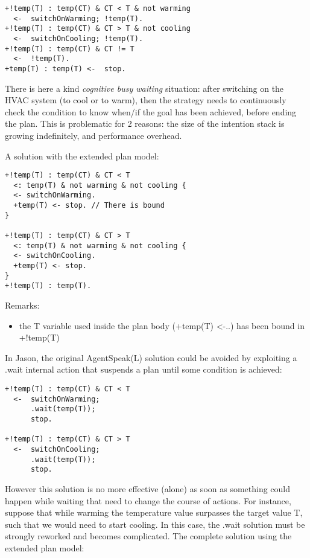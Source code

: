 {\small
\begin{verbatim}
+!temp(T) : temp(CT) & CT < T & not warming
  <-  switchOnWarming; !temp(T).
+!temp(T) : temp(CT) & CT > T & not cooling
  <-  switchOnCooling; !temp(T).
+!temp(T) : temp(CT) & CT != T 
  <-  !temp(T).
+temp(T) : temp(T) <-  stop.
\end{verbatim}}

\noindent There is here a kind \emph{cognitive busy waiting} situation: after switching on the HVAC system (to cool or to warm), then the strategy needs to continuously check the condition to know when/if the goal has been achieved, before ending the plan.
%
This is problematic for 2 reasons: the size of the intention stack is growing indefinitely, and 
performance overhead. 

A solution with the extended plan model:

{\small
\begin{verbatim}
+!temp(T) : temp(CT) & CT < T 
  <: temp(T) & not warming & not cooling {  
  <- switchOnWarming.
  +temp(T) <- stop. // There is bound	
}

+!temp(T) : temp(CT) & CT > T 
  <: temp(T) & not warming & not cooling {  
  <- switchOnCooling.	
  +temp(T) <- stop.		
}
+!temp(T) : temp(T).
\end{verbatim}}

Remarks:
\begin{itemize}
\item the T variable used inside the plan body (+temp(T) <-..) has been bound in +!temp(T)
\end{itemize}

\noindent  In Jason, the original AgentSpeak(L) solution could be avoided  by exploiting a .wait internal action that suspends a plan until some condition is achieved:

{\small
\begin{verbatim}
+!temp(T) : temp(CT) & CT < T 
  <-  switchOnWarming;
      .wait(temp(T));
      stop.

+!temp(T) : temp(CT) & CT > T 
  <-  switchOnCooling;
      .wait(temp(T));
      stop.
\end{verbatim}}

\noindent However this solution is no more effective (alone) as soon as something could happen while waiting that need to change the course of actions.  
%
For instance, suppose that while warming the temperature value surpasses the target value T, such that we would need to start cooling. In this case, the .wait solution must be strongly reworked and becomes complicated.
%
The complete solution using the extended plan model:


